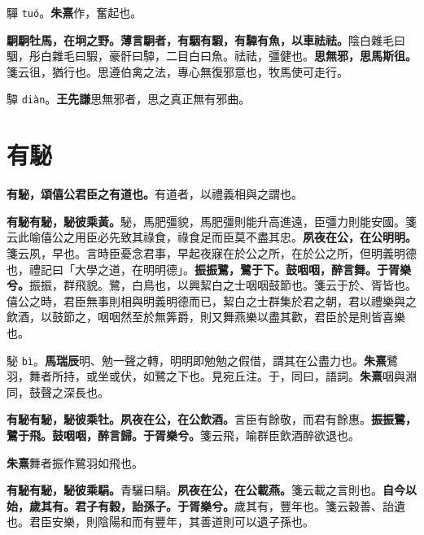 \begin{quoting}驒 \texttt{tuó}。\textbf{朱熹}作，奮起也。\end{quoting}

\textbf{駉駉牡馬，在坰之野。薄言駉者，有駰有騢，有驔有魚，以車祛祛。}{\footnotesize 陰白雜毛曰駰，彤白雜毛曰騢，豪骭曰驔，二目白曰魚。祛祛，彊健也。}\textbf{思無邪，思馬斯徂。}{\footnotesize 箋云徂，猶行也。思遵伯禽之法，專心無復邪意也，牧馬使可走行。}

\begin{quoting}驔 \texttt{diàn}。\textbf{王先謙}思無邪者，思之真正無有邪曲。\end{quoting}

\section{有駜}


\textbf{有駜，頌僖公君臣之有道也。}{\footnotesize 有道者，以禮義相與之謂也。}

\textbf{有駜有駜，駜彼乘黃。}{\footnotesize 駜，馬肥彊貌，馬肥彊則能升高進遠，臣彊力則能安國。箋云此喻僖公之用臣必先致其祿食，祿食足而臣莫不盡其忠。}\textbf{夙夜在公，在公明明。}{\footnotesize 箋云夙，早也。言時臣憂念君事，早起夜寐在於公之所，在於公之所，但明義明德也，禮記曰「大學之道，在明明德」。}\textbf{振振鷺，鷺于下。鼓咽咽，醉言舞。于胥樂兮。}{\footnotesize 振振，群飛貌。鷺，白鳥也，以興絜白之士咽咽鼓節也。箋云于於、胥皆也。僖公之時，君臣無事則相與明義明德而已，絜白之士群集於君之朝，君以禮樂與之飲酒，以鼓節之，咽咽然至於無筭爵，則又舞燕樂以盡其歡，君臣於是則皆喜樂也。}

\begin{quoting}駜 \texttt{bì}。\textbf{馬瑞辰}明、勉一聲之轉，明明即勉勉之假借，謂其在公盡力也。\textbf{朱熹}鷺羽，舞者所持，或坐或伏，如鷺之下也。見宛丘注。于，同曰，語詞。\textbf{朱熹}咽與淵同，鼓聲之深長也。\end{quoting}

\textbf{有駜有駜，駜彼乘牡。夙夜在公，在公飲酒。}{\footnotesize 言臣有餘敬，而君有餘惠。}\textbf{振振鷺，鷺于飛。鼓咽咽，醉言歸。于胥樂兮。}{\footnotesize 箋云飛，喻群臣飲酒醉欲退也。}

\begin{quoting}\textbf{朱熹}舞者振作鷺羽如飛也。\end{quoting}

\textbf{有駜有駜，駜彼乘駽。}{\footnotesize 青驪曰駽。}\textbf{夙夜在公，在公載燕。}{\footnotesize 箋云載之言則也。}\textbf{自今以始，歲其有。君子有穀，詒孫子。于胥樂兮。}{\footnotesize 歲其有，豐年也。箋云穀善、詒遺也。君臣安樂，則陰陽和而有豐年，其善道則可以遺子孫也。}

